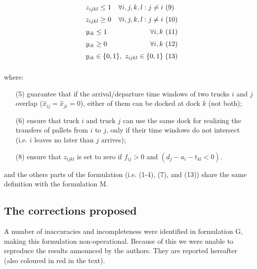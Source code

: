 \documentclass[preprint,12pt,authoryear]{elsarticle}
\begin{document}
\begin{equation*}
\begin{array}{ll@{}ll}
                    & z_{ijkl} \le 1   \hfill  \forall i,j,k,l : j \neq i & \ (9) \vspace{2mm}\\ 
                    & z_{ijkl} \ge 0   \hfill  \forall i,j,k,l : j \neq i &  \ (10) \vspace{2mm}\\ 
                    & y_{ik} \le 1   \hfill  \forall i,k & \ (11) \vspace{2mm}\\ 
                    & y_{ik} \ge 0 \hfill  \forall i,k &  \ (12) \vspace{2mm}\\                     
                    & y_{ik} \in \{0,1\}, \ z_{ijkl} \in \{0,1\} &  \ (13) \vspace{2mm}
    \end{array}
    \end{equation*}

\vspace{-2mm}
\noindent
where:
\begin{itemize}
    \item [(5)] guarantee that if the arrival/departure time windows of two trucks $i$ and $j$ overlap ($\hat{x}_{ij} = \hat{x}_{ji}=0$), either of them can be docked at dock $k$ (not both);
    \item [(6)] ensure that truck $i$ and truck $j$ can use the same dock for realizing the transfers of pallets from $i$ to $j$, only if their time windows do not intersect (i.e. $i$ leaves no later than $j$ arrives); 
    \item [(8)] ensure that $z_{ijkl}$ is set to zero if $f_{ij}>0$ and $(d_j - a_i - t_{kl} < 0)$.
\end{itemize}
and the others parts of the formulation (i.e. (1-4), (7), and (13)) share the same definition with the formulation M.  

%
%
\subsection{The corrections proposed}
\label{app:CorrectionsG}
\medskip

A number of inaccuracies and incompleteness were identified in formulation G, making this formulation non-operational. Because of this we were unable to reproduce the results announced by the authors. They are reported hereafter (also coloured in red in the text).
\end{document}
